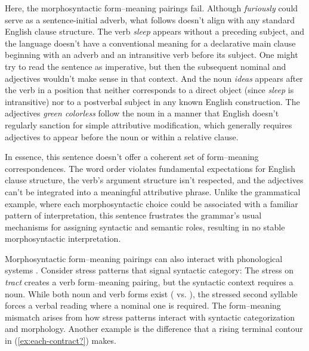 \documentclass[12pt,letterpaper]{article}
\begin{document}
Here, the morphosyntactic form--meaning pairings fail. Although \textit{furiously} could serve as a sentence-initial adverb, what follows doesn't align with any standard English clause structure. The verb \textit{sleep} appears without a preceding subject, and the language doesn't have a conventional meaning for a declarative main clause beginning with an adverb and an intransitive verb before its subject. One might try to read the sentence as imperative, but then the subsequent nominal and adjectives wouldn't make sense in that context. And the noun \textit{ideas} appears after the verb in a position that neither corresponds to a direct object (since \textit{sleep} is intransitive) nor to a postverbal subject in any known English construction. The adjectives \textit{green colorless} follow the noun in a manner that English doesn't regularly sanction for simple attributive modification, which generally requires adjectives to appear before the noun or within a relative clause.

In essence, this sentence doesn't offer a coherent set of form--meaning correspondences. The word order violates fundamental expectations for English clause structure, the verb’s argument structure isn't respected, and the adjectives can't be integrated into a meaningful attributive phrase. Unlike the grammatical example, where each morphosyntactic choice could be associated with a familiar pattern of interpretation, this sentence frustrates the grammar’s usual mechanisms for assigning syntactic and semantic roles, resulting in no stable morphosyntactic interpretation.

\bigskip
Morphosyntactic form--meaning pairings can also interact with phonological systems \autocite{Regev2024}. Consider stress patterns that signal syntactic category:
\z
The stress on \textit{tract} creates a verb form--meaning pairing, but the syntactic context requires a noun. While both noun and verb forms exist ( vs. ), the stressed second syllable forces a verbal reading where a nominal one is required. The form--meaning mismatch arises from how stress patterns interact with syntactic categorization and morphology. Another example is the difference that a rising terminal contour in (\ref{ex:each-contract?}) makes.

\label{ex:each-contract?}
\z
\end{document}
